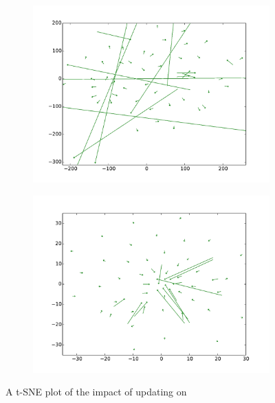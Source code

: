 \begin{figure}[t!]
\centering
\begin{subfigure}[b]{0.48\textwidth}
	\centering
    \includegraphics[width=\textwidth]{plots/vectorField/Lizhen/scaled/Lizhen_skip_chunking}
	\subcaption{\chunking}	
	\label{fig:skipChu}
\end{subfigure}
\begin{subfigure}[b]{0.48\textwidth}
	\centering
    \includegraphics[width=\textwidth]{plots/vectorField/Lizhen/Lizhen_skip_NER}    	
	\subcaption{\ner}
	\label{fig:skippos}	
\end{subfigure}
\caption{A t-SNE plot of the impact of updating on \Skipgram}
\label{fig:vectorfield}
\end{figure}



